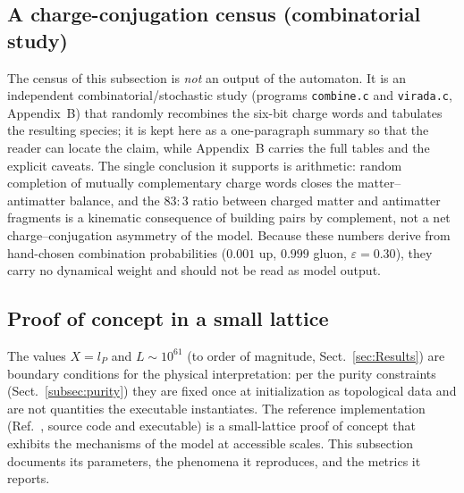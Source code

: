 \documentclass{ijuc}
\begin{document}
\subsection{A charge-conjugation census (combinatorial study)}\label{subsec:charge-census}
The census of this subsection is \emph{not} an output of the automaton. It is an independent combinatorial/stochastic study (programs \texttt{combine.c} and \texttt{virada.c}, Appendix~B) that randomly recombines the six-bit charge words and tabulates the resulting species; it is kept here as a one-paragraph summary so that the reader can locate the claim, while Appendix~B carries the full tables and the explicit caveats. The single conclusion it supports is arithmetic: random completion of mutually complementary charge words closes the matter--antimatter balance, and the $83{:}3$ ratio between charged matter and antimatter fragments is a kinematic consequence of building pairs by complement, not a net charge--conjugation asymmetry of the model. Because these numbers derive from hand-chosen combination probabilities ($0.001$ up, $0.999$ gluon, $\varepsilon=0.30$), they carry no dynamical weight and should not be read as model output.
\subsection{Proof of concept in a small lattice}\label{subsec:proof-of-concept}
The values $X=l_{P}$ and $L\sim10^{61}$ (to order of magnitude, Sect.~\ref{sec:Results}) are boundary conditions for the physical interpretation: per the purity constraints (Sect.~\ref{subsec:purity}) they are fixed once at initialization as topological data and are not quantities the executable instantiates.  The reference implementation (Ref.~\cite{af_neto}, source code and executable) is a small-lattice proof of concept that exhibits the mechanisms of the model at accessible scales.  This subsection documents its parameters, the phenomena it reproduces, and the metrics it reports.
\end{document}
